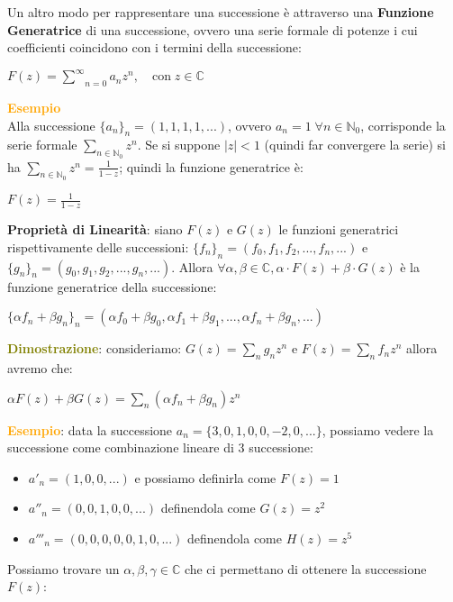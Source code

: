 \begin{flushleft}
    Un altro modo per rappresentare una successione è attraverso una \textbf{Funzione Generatrice} di una successione, ovvero una serie formale di potenze i cui coefficienti coincidono con i termini della successione:

    {\centering
        $F(z) = \underset{n=0}{\overset{\infty}{\sum}}a_nz^n, \quad \text{con} \; z \in \mathbb{C}$
    \par}
    \begin{boxA}
        \textcolor{orange}{\textbf{Esempio}} \\
        Alla successione $\{a_n\}_n = (1, 1, 1, 1, ...)$, ovvero $a_n = 1 \; \forall n \in \mathbb{N}_0$, corrisponde la serie formale $\sum_{n \in \mathbb{N}_0}z^n$. Se si suppone $|z| < 1$ (quindi far convergere la serie) si ha $\sum_{n \in \mathbb{N}_0} z^n = \frac{1}{1-z}$; quindi la funzione generatrice è:

        {\centering
            $F(z) = \frac{1}{1-z}$
        \par}
    \end{boxA}
    
    \textbf{Proprietà di Linearità}: siano $F(z)$ e $G(z)$ le funzioni generatrici rispettivamente delle successioni: $\{f_n\}_n = (f_0, f_1, f_2, ..., f_n, ...)$ e $\{g_n\}_n = (g_0, g_1, g_2, ..., g_n, ...)$. Allora $\forall \alpha, \beta \in \mathbb{C}, \alpha \cdot F(z) + \beta \cdot G(z)$ è la funzione generatrice della successione:

    {\centering
        $\{\alpha f_n + \beta g_n\}_n = (\alpha f_0 + \beta g_0, \alpha f_1 + \beta g_1, ..., \alpha f_n + \beta g_n, ...)$
    \par}

    \begin{boxA}
        \textcolor{olive}{\textbf{Dimostrazione}}: consideriamo: $G(z) = \sum_n g_nz^n$ e $F(z) = \sum_n f_nz^n$ allora avremo che:

        {\centering
            $\alpha F(z) + \beta G(z) = \sum_n (\alpha f_n + \beta g_n)z^n$
        \par}
    \end{boxA}

    \begin{boxA}
        \textcolor{orange}{\textbf{Esempio}}: data la successione $a_n = \{3, 0, 1, 0, 0, -2, 0, ...\}$, possiamo vedere la successione come combinazione lineare di 3 successione:
        \begin{itemize}[nosep]
            \item $a'_n = (1, 0, 0, ...)$ e possiamo definirla come $F(z) = 1$
            \item $a''_n = (0, 0, 1, 0, 0, ...)$ definendola come $G(z) = z^2$
            \item $a'''_n = (0, 0, 0, 0, 0, 1, 0, ...)$ definendola come $H(z) = z^5$
        \end{itemize}
        Possiamo trovare un $\alpha, \beta, \gamma \in \mathbb{C}$ che ci permettano di ottenere la successione $F(z)$:


\end{boxA}
\end{flushleft}
